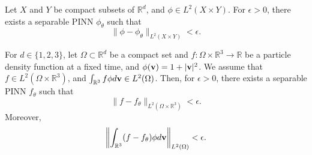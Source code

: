 \documentclass[10pt,a4paper]{amsart}
\begin{document}
\begin{theorem}\label{thm:uat_spinn}
Let $X$ and $Y$ be compact subsets of $\mathbb{R}^d$, and $\phi \in L^2 (X\times Y)$.
For $\epsilon >0$, there exists a separable PINN $\phi_\theta$ such that
\[
    \| \phi - \phi_\theta \|_{L^2(X\times Y)} < \epsilon.
\]
\end{theorem}

\begin{theorem}\label{thm:uat_spinn_f}
    For $d \in \{1, 2, 3\}$,
    let $\Omega \subset \mathbb{R}^d$ be a compact set and $f: \Omega \times \mathbb{R}^3 \rightarrow \mathbb{R}$ be a particle density function at a fixed time, and $\phi({\bf v}) = 1 + |{\bf v}|^2$.
    We assume that $f \in L^2(\Omega \times \mathbb{R}^3)$,
    and $\int_{\mathbb{R}^3} f\phi d{\bf v} \in L^2(\Omega)$.
    Then, for $\epsilon >0$, there exists a separable PINN $f_\theta$ such that
    \[
        \| f - f_\theta \|_{L^2(\Omega \times \mathbb{R}^3)} < \epsilon.
    \]
    Moreover, 
    \[
        \left\|\int_{\mathbb{R}^3} (f - f_\theta)\phi d{\bf v}\right\|_{L^2(\Omega)} < \epsilon.
    \]
\end{theorem}
\end{document}
